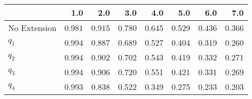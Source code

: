 \begin{tabular}{lrrrrrrr}
\toprule
{} &   1.0 &   2.0 &   3.0 &   4.0 &   5.0 &   6.0 &   7.0 \\
\midrule
No Extension & 0.981 & 0.915 & 0.780 & 0.645 & 0.529 & 0.436 & 0.366 \\
$q_1$        & 0.994 & 0.887 & 0.689 & 0.527 & 0.404 & 0.319 & 0.260 \\
$q_2$        & 0.994 & 0.902 & 0.702 & 0.543 & 0.419 & 0.332 & 0.271 \\
$q_3$        & 0.994 & 0.906 & 0.720 & 0.551 & 0.421 & 0.331 & 0.269 \\
$q_4$        & 0.993 & 0.838 & 0.522 & 0.349 & 0.275 & 0.233 & 0.203 \\
\bottomrule
\end{tabular}
